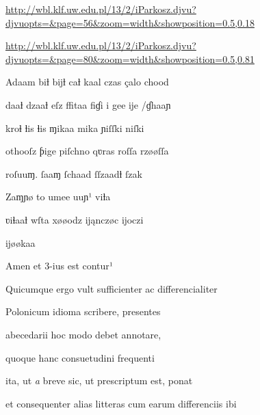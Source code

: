 
\newParkoszpage

{
\url{http://wbl.klf.uw.edu.pl/13/2/iParkosz.djvu?djvuopts=&page=56&zoom=width&showposition=0.5,0.18}

\url{http://wbl.klf.uw.edu.pl/13/2/iParkosz.djvu?djvuopts=&page=80&zoom=width&showposition=0.5,0.81}
}

\bigskip

\obeylines
\mono

\fulllines









\fulllines

Adaam biƚ bĳƚ caƚ kaal czas çalo chood 

daaƚ dzaaƚ eſz ﬀitaa fiɠi i gee ĳe /ɠhaaɲ 

kroɬ ƚis ɬis ɱikaa mika ɲiſſki niſki 

othooſz ƥige piſchno qʋras roſſa rzøøſſa 

roſuuɱ. ſaaɱ ſchaad ſſzaadƚ ſzak 

 Zaɱɲø to umee uuɲ¹ viƚa 

ʋiɬaaƚ wſta xøøodz ĳąnczøc ĳoczi

ĳøøkaa

Amen et 3-ius est contur¹

Quicumque ergo vult sufficienter ac differencialiter

Polonicum idioma scribere, presentes 

 abecedarii hoc modo debet annotare, 

 quoque hanc consuetudini frequenti 

 ita, ut \textit{a} breve sic, ut prescriptum est, ponat 

et consequenter alias litteras cum earum differenciis ibi 

